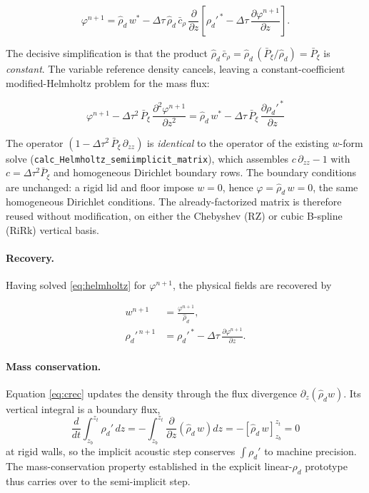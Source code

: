 \documentclass[11pt, oneside]{article}   	%
\begin{document}
\begin{equation}
\varphi^{n+1} = \hat{\rho}_d\, w^{*}
   - \Delta\tau\,\hat{\rho}_d\,\bar{c}_\rho\,\frac{\partial}{\partial z}
     \left[ \rho_d'^{\,*} - \Delta\tau\,\frac{\partial \varphi^{n+1}}{\partial z} \right] .
\end{equation}

The decisive simplification is that the product
$\hat{\rho}_d\,\bar{c}_\rho = \hat{\rho}_d\,(\bar{P}_\xi/\hat{\rho}_d) = \bar{P}_\xi$
is \emph{constant}. The variable reference density cancels, leaving a
constant-coefficient modified-Helmholtz problem for the mass flux:

\begin{equation}
\boxed{\;
\varphi^{n+1} - \Delta\tau^2\,\bar{P}_\xi\,\frac{\partial^2 \varphi^{n+1}}{\partial z^2}
   = \hat{\rho}_d\, w^{*} - \Delta\tau\,\bar{P}_\xi\,\frac{\partial \rho_d'^{\,*}}{\partial z} \; }
\label{eq:helmholtz}
\end{equation}

The operator $\left(1 - \Delta\tau^2\,\bar{P}_\xi\,\partial_{zz}\right)$ is
\emph{identical} to the operator of the existing $w$-form solve
(\texttt{calc\_Helmholtz\_semiimplicit\_matrix}), which assembles
$c\,\partial_{zz} - 1$ with $c = \Delta\tau^2 \bar{P}_\xi$ and homogeneous Dirichlet
boundary rows. The boundary conditions are unchanged: a rigid lid and floor impose
$w = 0$, hence $\varphi = \hat{\rho}_d\, w = 0$, the same homogeneous Dirichlet
conditions. The already-factorized matrix is therefore reused without modification, on
either the Chebyshev (RZ) or cubic B-spline (RiRk) vertical basis.

\paragraph{Recovery.} Having solved \eqref{eq:helmholtz} for $\varphi^{n+1}$, the
physical fields are recovered by

\begin{align}
w^{n+1} &= \frac{\varphi^{n+1}}{\hat{\rho}_d} , \label{eq:wrec} \\
\rho_d'^{\,n+1} &= \rho_d'^{\,*} - \Delta\tau\,\frac{\partial \varphi^{n+1}}{\partial z} .
   \label{eq:crec}
\end{align}

\paragraph{Mass conservation.} Equation \eqref{eq:crec} updates the density through the
flux divergence $\partial_z(\hat{\rho}_d w)$. Its vertical integral is a boundary flux,
\begin{equation}
\frac{d}{dt}\int_{z_b}^{z_t}\!\rho_d'\,dz
   = -\int_{z_b}^{z_t}\!\frac{\partial}{\partial z}\!\left(\hat{\rho}_d\, w\right)dz
   = -\left[\hat{\rho}_d\, w\right]_{z_b}^{z_t} = 0
\end{equation}
at rigid walls, so the implicit acoustic step conserves $\int \rho_d'$ to machine
precision. The mass-conservation property established in the explicit linear-$\rho_d$
prototype thus carries over to the semi-implicit step.
\end{document}

